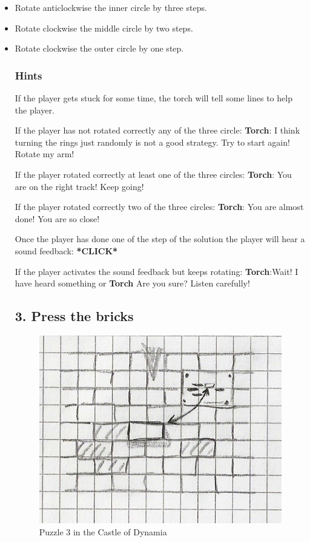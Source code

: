 \begin{itemize}
\item Rotate anticlockwise the inner circle by three steps.

\item Rotate clockwise the middle circle by two steps.

\item Rotate clockwise the outer circle by one step.


\subsubsection*{Hints}
If the player gets stuck for some time, the torch will tell some lines to help the player.

If the player has not rotated correctly any of the three circle:
\textbf{Torch}: I think turning the rings just randomly is not a good strategy. Try to start again! Rotate my arm!

If the player rotated correctly at least one of the three circles:
\textbf{Torch}: You are on the right track! Keep going!

If the player rotated correctly two of the three circles:
\textbf{Torch}: You are almost done! You are so close!

Once the player has done one of the step of the solution the player will hear a sound feedback: 
\textbf{*CLICK*}

If the player activates the sound feedback but keeps rotating:
\textbf{Torch}:Wait! I have heard something
or
\textbf{Torch} Are you sure? Listen carefully!

\subsection{3. Press the bricks}

\begin{figure}[H]
  \centering
  \includegraphics[width=\textwidth]{Images/Puzzles/castleOfDynamia_3}
  \caption{Puzzle 3 in the Castle of Dynamia}
\end{figure}


\end{itemize}
